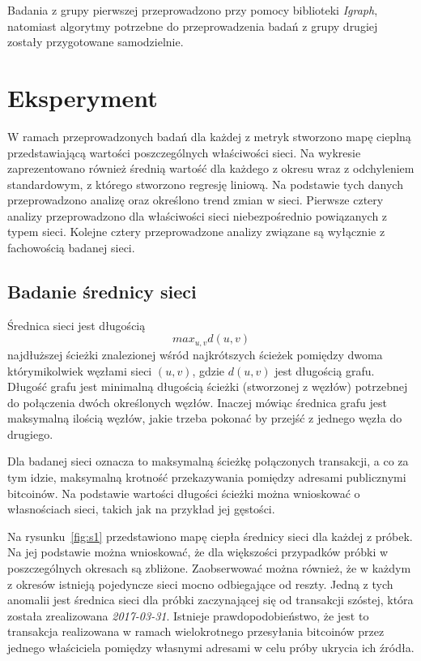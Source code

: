 \documentclass[12pt, twoside, final, openany]{mgr}
\begin{document}
\indent Badania z grupy pierwszej przeprowadzono przy pomocy biblioteki \textit{Igraph}, natomiast algorytmy potrzebne do przeprowadzenia badań z grupy drugiej zostały przygotowane samodzielnie.

\section{Eksperyment}
W ramach przeprowadzonych badań dla każdej z metryk stworzono mapę cieplną przedstawiającą wartości poszczególnych właściwości sieci. Na wykresie zaprezentowano również średnią wartość dla każdego z okresu wraz z odchyleniem standardowym, z którego stworzono regresję liniową. Na podstawie tych danych przeprowadzono analizę oraz określono trend zmian w sieci. Pierwsze cztery analizy przeprowadzono dla właściwości sieci niebezpośrednio powiązanych z typem sieci. Kolejne cztery przeprowadzone analizy związane są wyłącznie z fachowością badanej sieci.

\subsection{Badanie średnicy sieci}
\label{srednica_sieci}
\indent Średnica sieci jest długością 
\begin{equation}
\label{eq:srednica_sieci}
	max_{u,v}d(u,v)
\end{equation}
najdłuższej ścieżki znalezionej wśród najkrótszych ścieżek pomiędzy dwoma którymikolwiek węzłami sieci $(u,v)$, gdzie $d(u,v)$ jest długością grafu\cite{barabasi2016network}. Długość grafu jest minimalną długością ścieżki (stworzonej z węzłów) potrzebnej do połączenia dwóch określonych węzłów. Inaczej mówiąc średnica grafu jest maksymalną ilością węzłów, jakie trzeba pokonać by przejść z jednego węzła do drugiego.

\indent Dla badanej sieci oznacza to maksymalną ścieżkę połączonych transakcji, a co za tym idzie, maksymalną krotność przekazywania pomiędzy adresami publicznymi bitcoinów. Na podstawie wartości długości ścieżki można wnioskować o własnościach sieci, takich jak na przykład jej gęstości.

\indent Na rysunku~\ref{fig:s1} przedstawiono mapę ciepła średnicy sieci dla każdej z próbek. Na jej podstawie można wnioskować, że dla większości przypadków próbki w poszczególnych okresach są zbliżone. Zaobserwować można również, że w każdym z okresów istnieją pojedyncze sieci mocno odbiegające od reszty. Jedną z tych anomalii jest średnica sieci dla próbki zaczynającej się od transakcji szóstej, która została zrealizowana \textit{2017-03-31}. Istnieje prawdopodobieństwo, że jest to transakcja realizowana w ramach wielokrotnego przesyłania bitcoinów przez jednego właściciela pomiędzy własnymi adresami w celu próby ukrycia ich źródła.
\end{document}
